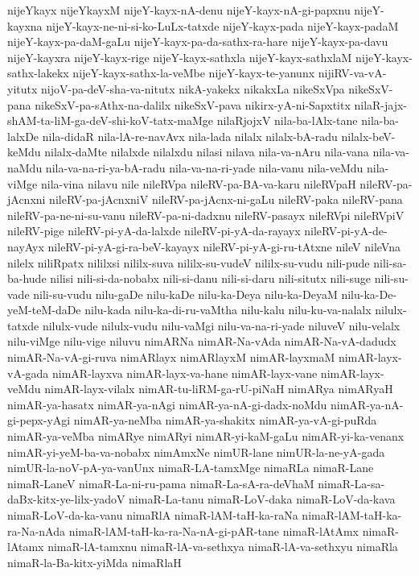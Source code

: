 {nijeYkayx
nijeYkayxM
nijeY-kayx-nA-denu
nijeY-kayx-nA-gi-papxnu
nijeY-kayxna
nijeY-kayx-ne-ni-si-ko-LuLx-tatxde
nijeY-kayx-pada
nijeY-kayx-padaM
nijeY-kayx-pa-daM-gaLu
nijeY-kayx-pa-da-sathx-ra-hare
nijeY-kayx-pa-davu
nijeY-kayxra
nijeY-kayx-rige
nijeY-kayx-sathxla
nijeY-kayx-sathxlaM
nijeY-kayx-sathx-lakekx
nijeY-kayx-sathx-la-veMbe
nijeY-kayx-te-yanunx
nijiRV-va-vA-yitutx
nijoV-pa-deV-sha-va-nitutx
nikA-yakekx
nikakxLa
nikeSxVpa
nikeSxV-pana
nikeSxV-pa-sAthx-na-dalilx
nikeSxV-pava
nikirx-yA-ni-Sapxtitx
nilaR-jajx-shAM-ta-liM-ga-deV-shi-koV-tatx-maMge
nilaRjojxV
nila-ba-lAlx-tane
nila-ba-lalxDe
nila-didaR
nila-lA-re-navAvx
nila-lada
nilalx
nilalx-bA-radu
nilalx-beV-keMdu
nilalx-daMte
nilalxde
nilalxdu
nilasi
nilava
nila-va-nAru
nila-vana
nila-va-naMdu
nila-va-na-ri-ya-bA-radu
nila-va-na-ri-yade
nila-vanu
nila-veMdu
nila-viMge
nila-vina
nilavu
nile
nileRVpa
nileRV-pa-BA-va-karu
nileRVpaH
nileRV-pa-jAcnxni
nileRV-pa-jAcnxniV
nileRV-pa-jAcnx-ni-gaLu
nileRV-paka
nileRV-pana
nileRV-pa-ne-ni-su-vanu
nileRV-pa-ni-dadxnu
nileRV-pasayx
nileRVpi
nileRVpiV
nileRV-pige
nileRV-pi-yA-da-lalxde
nileRV-pi-yA-da-rayayx
nileRV-pi-yA-de-nayAyx
nileRV-pi-yA-gi-ra-beV-kayayx
nileRV-pi-yA-gi-ru-tAtxne
nileV
nileVna
nilelx
niliRpatx
nililxsi
nililx-suva
nililx-su-vudeV
nililx-su-vudu
nili-pude
nili-sa-ba-hude
nilisi
nili-si-da-nobabx
nili-si-danu
nili-si-daru
nili-situtx
nili-suge
nili-su-vade
nili-su-vudu
nilu-gaDe
nilu-kaDe
nilu-ka-Deya
nilu-ka-DeyaM
nilu-ka-De-yeM-teM-daDe
nilu-kada
nilu-ka-di-ru-vaMtha
nilu-kalu
nilu-ku-va-nalalx
nilulx-tatxde
nilulx-vude
nilulx-vudu
nilu-vaMgi
nilu-va-na-ri-yade
niluveV
nilu-velalx
nilu-viMge
nilu-vige
niluvu
nimARNa
nimAR-Na-vAda
nimAR-Na-vA-dadudx
nimAR-Na-vA-gi-ruva
nimARlayx
nimARlayxM
nimAR-layxmaM
nimAR-layx-vA-gada
nimAR-layxva
nimAR-layx-va-hane
nimAR-layx-vane
nimAR-layx-veMdu
nimAR-layx-vilalx
nimAR-tu-liRM-ga-rU-piNaH
nimARya
nimARyaH
nimAR-ya-hasatx
nimAR-ya-nAgi
nimAR-ya-nA-gi-dadx-noMdu
nimAR-ya-nA-gi-pepx-yAgi
nimAR-ya-neMba
nimAR-ya-shakitx
nimAR-ya-vA-gi-puRda
nimAR-ya-veMba
nimARye
nimARyi
nimAR-yi-kaM-gaLu
nimAR-yi-ka-venanx
nimAR-yi-yeM-ba-va-nobabx
nimAmxNe
nimUR-lane
nimUR-la-ne-yA-gada
nimUR-la-noV-pA-ya-vanUnx
nimaR-LA-tamxMge
nimaRLa
nimaR-Lane
nimaR-LaneV
nimaR-La-ni-ru-pama
nimaR-La-sA-ra-deVhaM
nimaR-La-sa-daBx-kitx-ye-lilx-yadoV
nimaR-La-tanu
nimaR-LoV-daka
nimaR-LoV-da-kava
nimaR-LoV-da-ka-vanu
nimaRlA
nimaR-lAM-taH-ka-raNa
nimaR-lAM-taH-ka-ra-Na-nAda
nimaR-lAM-taH-ka-ra-Na-nA-gi-pAR-tane
nimaR-lAtAmx
nimaR-lAtamx
nimaR-lA-tamxnu
nimaR-lA-va-sethxya
nimaR-lA-va-sethxyu
nimaRla
nimaR-la-Ba-kitx-yiMda
nimaRlaH
}
